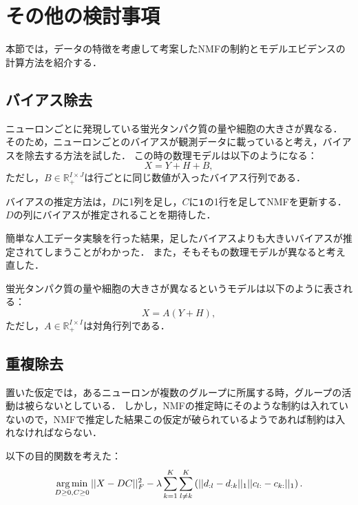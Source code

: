 \chapter{その他の検討事項}
本節では，データの特徴を考慮して考案したNMFの制約とモデルエビデンスの計算方法を紹介する．

\section{バイアス除去}
ニューロンごとに発現している蛍光タンパク質の量や細胞の大きさが異なる．
そのため，ニューロンごとのバイアスが観測データに載っていると考え，バイアスを除去する方法を試した．
この時の数理モデルは以下のようになる：
\begin{equation}
	X = Y + H + B,
\end{equation}
ただし，$B \in \mathbb{R}_+^{I\times J}$は行ごとに同じ数値が入ったバイアス行列である．

バイアスの推定方法は，$D$に1列を足し，$C$に$\mathbf 1$の1行を足してNMFを更新する．
$D$の列にバイアスが推定されることを期待した．

簡単な人工データ実験を行った結果，足したバイアスよりも大きいバイアスが推定されてしまうことがわかった．
また，そもそもの数理モデルが異なると考え直した．

蛍光タンパク質の量や細胞の大きさが異なるというモデルは以下のように表される：
\begin{equation}
	X = A(Y + H),
\end{equation}
ただし，$A \in \mathbb{R}_+^{I \times I}$は対角行列である．

\section{重複除去}
置いた仮定では，あるニューロンが複数のグループに所属する時，グループの活動は被らないとしている．
しかし，NMFの推定時にそのような制約は入れていないので，NMFで推定した結果この仮定が破られているようであれば制約は入れなければならない．

以下の目的関数を考えた：
\begin{align}
	\operatorname*{arg\,min}_{D \geq 0, C \geq 0} ||X - DC||_F^2 - \lambda \sum_{k=1}^K \sum_{l \neq k}^K \left( || d_{:l} - d_{:k} ||_1 || c_{l:} - c_{k:} ||_1 \right).
  \label{eq:overlap}
\end{align}

